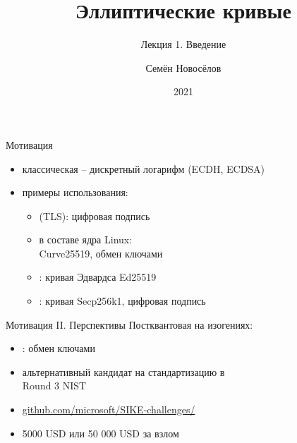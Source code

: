 \documentclass{beamer}
\title{Эллиптические кривые}
\subtitle{Лекция 1. Введение}
\author{Семён Новосёлов}
\institute{БФУ им. И. Канта}
\date{2021}
\begin{document}
    

\frame{\titlepage}

\begin{frame}{Мотивация}
    \begin{itemize}
        \item классическая -- дискретный логарифм (ECDH, ECDSA)
            \item примеры использования:
            \begin{itemize}
                \item {} (TLS): цифровая подпись
                \item {} в составе ядра Linux:
                \\Curve25519, обмен ключами
                \item {}: кривая Эдвардса Ed25519
                \item {}: кривая Secp256k1, цифровая подпись
            \end{itemize}
    \end{itemize}
\end{frame}

\begin{frame}{Мотивация II. Перспективы}
Постквантовая  на изогениях:
\begin{itemize}
    \item {}: обмен ключами
    \item альтернативный кандидат на стандартизацию в \\Round 3 NIST
\end{itemize}

\begin{tcolorbox}[colframe=title-and-section-color!120, colback=title-and-section-color!5, title=SIKE Cryptographic Challenge, center title]
\begin{itemize}
    \item {\small
        \href{https://github.com/microsoft/SIKE-challenges/}{github.com/microsoft/SIKE-challenges/}}
    \item 5000 USD или 50 000 USD за взлом
\end{itemize}
\end{tcolorbox}
\end{frame}
\end{document}
